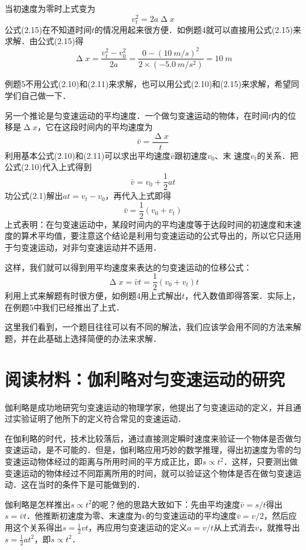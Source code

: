 当初速度为零时上式变为
\begin{equation}
    v^2_t=2a\upDelta x
\end{equation}
公式(2.15)在不知道时间$t$的情况用起来很方便．如例题4就可以直接用公式(2.15)来求解．由公式(2.15)得
\[\upDelta x=\frac{v^2_t-v^2_0}{2a}=\frac{0-(\qty{10}{m/s})^2}{2\times (\qty{-5.0}{m/s^2})}=\qty{10}{m}\]

例题5不用公式(2.10)和(2.11)来求解，也可以用公式(2.10)和(2.15)来求解，希望同学们自己做一下．

另一个推论是匀变速运动的平均速度．一个做匀变速运动的物体，在时间$t$内的位移是$\upDelta x$，它在这段时间内的平均速度为
\[\bar v=\frac{\upDelta x}{t} \]
利用基本公式(2.10)和(2.11)可以求出平均速度$\bar v$跟初速度$v_0$、末
速度$v_t$的关系．把公式(2.10)代入上式得到
\[\bar v=v_0+\frac{1}{2}at \]
功公式(2.1)解出$at=v_t-v_0$，再代入上式即得
\begin{equation}
    \bar v=\frac{1}{2}(v_0+v_t)
\end{equation}
上式表明：在匀变速运动中，某段时间内的平均速度等于达段时间的初速度和末速度的算术平均值，要注意这个结论是利用匀变速运动的公式导出的，所以它只适用于匀变速运动，对非匀变速运动并不适用．

这样，我们就可以得到用平均速度来表达的匀变速运动的位移公式：
\[\upDelta x=\bar v t=\frac{1}{2} (v_0+v_t)t\]
利用上式来解题有时很方便，如例题4用上式解出$t$，代入数值即得答案．实际上，在例题5中我们已经推出了上式．

这里我们看到，一个题目往往可以有不同的解法，我们应该学会用不同的方法来解题，并在此基础上选择简便的办法来求解．


\section*{阅读材料：伽利略对匀变速运动的研究}
伽利略是成功地研究匀变速运动的物理学家，他提出了匀变速运动的定义，并且通过实验证明了他所下的定义符合常见的变速运动．

在伽利略的时代，技术比较落后，通过直接测定瞬时速度来验证一个物体是否做匀变速运动，是不可能的．但是，伽利略应用巧妙的数学推理，得出初速度为零的匀变速运动物体经过的距离与所用时间的平方成正比，即$s\propto t^2$．这样，只要测出做变速运动的物体经过不同距离所用的时间，就可以验证这个物体是否在做匀变速运动．这在当时的条件下是可能做到的．

伽利略是怎样推出$s\propto t^2$的呢？他的思路大致如下：先由平均速度$\bar v=s/t$得出$s=\bar v t$．他推断初速度为零、末速度为$v$的匀变速运动的平均速度$\bar v=v/2$，然后应用这个关系得出$s=\frac{1}{2} v t$，再应用匀变速运动的定义$a=v/t$从上式消去$v$，就推导出$s=\frac{1}{2} a t^2$，即$s\propto t^2$．

